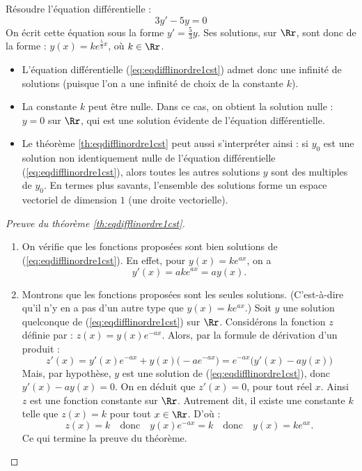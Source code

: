 \documentclass[class=report,crop=false]{standalone}
\begin{document}
\begin{exemple}
Résoudre l'équation différentielle :
$$3y' - 5y = 0$$
On écrit cette équation sous la forme $y' = \frac53 y$.
Ses solutions, sur $\Rr$, sont donc de la forme :
$y(x) = k e^{\frac53x}$, où $k \in \Rr$.
\end{exemple}

\begin{remarque*}
\sauteligne
\begin{itemize}
  \item L'équation différentielle (\ref{eq:eqdifflinordre1cst})
admet donc une infinité de solutions (puisque l'on a une
infinité de choix de la constante $k$).

  \item La constante $k$ peut être nulle. Dans ce cas, on obtient
  la \og solution nulle \fg{} : $y = 0$ sur $\Rr$, qui est une solution
  évidente de l'équation différentielle.

  \item Le théorème \ref{th:eqdifflinordre1cst} peut aussi s'interpréter ainsi :
  si $y_0$ est une solution non identiquement nulle de
l'équation différentielle (\ref{eq:eqdifflinordre1cst}),
alors toutes les autres solutions $y$ sont des multiples de $y_0$. En termes plus savants,
l'ensemble des solutions forme un espace vectoriel de dimension $1$ (une droite vectorielle).
\end{itemize}
\end{remarque*}


\begin{proof}[Preuve du théorème \ref{th:eqdifflinordre1cst}]
~
\begin{enumerate}
  \item On vérifie que les fonctions proposées sont bien solutions de (\ref{eq:eqdifflinordre1cst}).
  En effet, pour $y(x) = k e^{ax}$, on a
  $$y'(x) = ake^{ax} = a y(x).$$

  \item Montrons que les fonctions proposées sont les seules solutions.
  (C'est-à-dire qu'il n'y en a pas d'un autre type que $y(x)= k e^{ax}$.)
  Soit $y$ une solution quelconque de (\ref{eq:eqdifflinordre1cst}) sur $\Rr$.
  Considérons la fonction $z$ définie par : $z(x) = y(x) e^{-ax}$.
  Alors, par la formule de dérivation d'un produit :
  $$z'(x) = y'(x)e^{-ax} +  y(x)\big(-ae^{-ax}\big) =  e^{-ax}\big(y'(x)-ay(x)\big)$$
  Mais, par hypothèse, $y$ est une solution de (\ref{eq:eqdifflinordre1cst}),
  donc $y'(x) - ay(x) = 0$. On en déduit que $z'(x) = 0$, pour tout réel $x$.
  Ainsi $z$ est une fonction constante sur $\Rr$.
  Autrement dit, il existe une constante $k$ telle que $z(x)=k$ pour tout $x\in \Rr$.
  D'où :
  $$z(x)= k \quad\text{donc}\quad  y(x) e^{-ax} = k \quad\text{donc}\quad
  y(x) = ke^{ax}.$$
  Ce qui termine la preuve du théorème.
\end{enumerate}


\end{proof}
\end{document}
